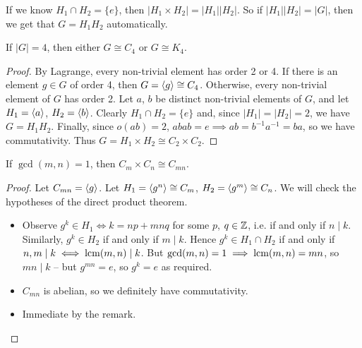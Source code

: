 \documentclass{../template/note}
\begin{document}
    \begin{remark*}
        If we know \(H_1 \cap H_2 = \{e\}\), then \(|H_1 \times H_2| = |H_1||H_2|\). So if \(|H_1||H_2| = |G|\), then we get that \(G = H_1H_2\) automatically.
    \end{remark*}
    
    \begin{lemma}
        If \(|G| = 4\), then either \(G \cong C_4\) or \(G \cong K_4\).
    \end{lemma}
    
    \begin{proof}
        By Lagrange, every non-trivial element has order 2 or 4. If there is an element \(g \in G\) of order 4, then \(G = \left \langle g \right \rangle \cong C_4\). Otherwise, every non-trivial element of \(G\) has order 2. Let \(a\), \(b\) be distinct non-trivial elements of \(G\), and let \(H_1 = \left \langle a \right \rangle\), \(H_2 = \left \langle b \right \rangle\). Clearly \(H_1 \cap H_2 = \{e\}\) and, since \(|H_1| = |H_2| = 2\), we have \(G = H_1H_2\). Finally, since \(o(ab) = 2\), \(abab = e \implies ab = b^{-1}a^{-1} = ba\), so we have commutativity. Thus \(G = H_1 \times H_2 \cong C_2 \times C_2\).
    \end{proof}
    
    \begin{theorem}
        If \(\gcd(m, n) = 1\), then \(C_m \times C_n \cong C_{mn}\).
        \label{chinese-remainder-theorem}
    \end{theorem}
    
    \begin{proof}
        Let \(C_{mn} = \left \langle g \right \rangle\). Let \(H_1 = \left \langle g^n \right \rangle \cong C_m\), \(H_2 = \left \langle g^m \right \rangle \cong C_n\). We will check the hypotheses of the direct product theorem.
        \begin{itemize}
            \item Observe \(g^k \in H_1 \iff k = np + mnq\) for some \(p\), \(q \in \mathbb Z\), i.e. if and only if \(n \mid k\). Similarly, \(g^k \in H_2\) if and only if \(m \mid k\). Hence \(g^k \in H_1 \cap H_2\) if and only if \(n, m \mid k \iff \operatorname*{lcm}(m, n) \mid k\). But \(\gcd(m, n) = 1 \implies \operatorname*{lcm}(m, n) = mn\), so \(mn \mid k\) -- but \(g^{mn} = e\), so \(g^k = e\) as required.
            \item \(C_{mn}\) is abelian, so we definitely have commutativity.
            \item Immediate by the remark.
        \end{itemize}
    \end{proof}
    
\end{document}
